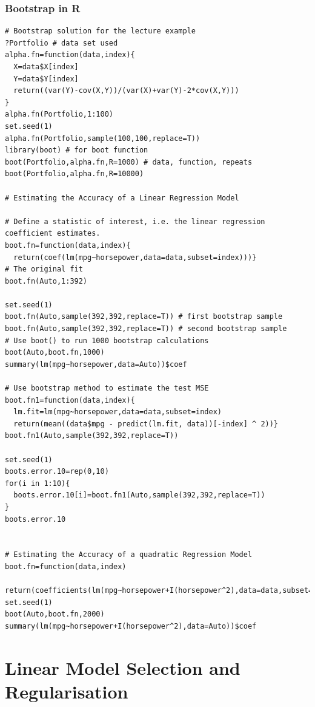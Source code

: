 \documentclass[11pt]{article}
\begin{document}
\subsubsection{Bootstrap in R}
\begin{lstlisting}
# Bootstrap solution for the lecture example
?Portfolio # data set used
alpha.fn=function(data,index){
  X=data$X[index]
  Y=data$Y[index]
  return((var(Y)-cov(X,Y))/(var(X)+var(Y)-2*cov(X,Y)))
}
alpha.fn(Portfolio,1:100)
set.seed(1)
alpha.fn(Portfolio,sample(100,100,replace=T))
library(boot) # for boot function
boot(Portfolio,alpha.fn,R=1000) # data, function, repeats
boot(Portfolio,alpha.fn,R=10000)

# Estimating the Accuracy of a Linear Regression Model

# Define a statistic of interest, i.e. the linear regression coefficient estimates.
boot.fn=function(data,index){
  return(coef(lm(mpg~horsepower,data=data,subset=index)))}
# The original fit
boot.fn(Auto,1:392)

set.seed(1)
boot.fn(Auto,sample(392,392,replace=T)) # first bootstrap sample
boot.fn(Auto,sample(392,392,replace=T)) # second bootstrap sample
# Use boot() to run 1000 bootstrap calculations 
boot(Auto,boot.fn,1000)
summary(lm(mpg~horsepower,data=Auto))$coef

# Use bootstrap method to estimate the test MSE
boot.fn1=function(data,index){
  lm.fit=lm(mpg~horsepower,data=data,subset=index)
  return(mean((data$mpg - predict(lm.fit, data))[-index] ^ 2))}
boot.fn1(Auto,sample(392,392,replace=T))

set.seed(1)
boots.error.10=rep(0,10)
for(i in 1:10){
  boots.error.10[i]=boot.fn1(Auto,sample(392,392,replace=T))
}
boots.error.10


# Estimating the Accuracy of a quadratic Regression Model
boot.fn=function(data,index)
  return(coefficients(lm(mpg~horsepower+I(horsepower^2),data=data,subset=index)))
set.seed(1)
boot(Auto,boot.fn,2000)
summary(lm(mpg~horsepower+I(horsepower^2),data=Auto))$coef
\end{lstlisting}

\newpage
\section{Linear Model Selection and Regularisation}
\end{document}
